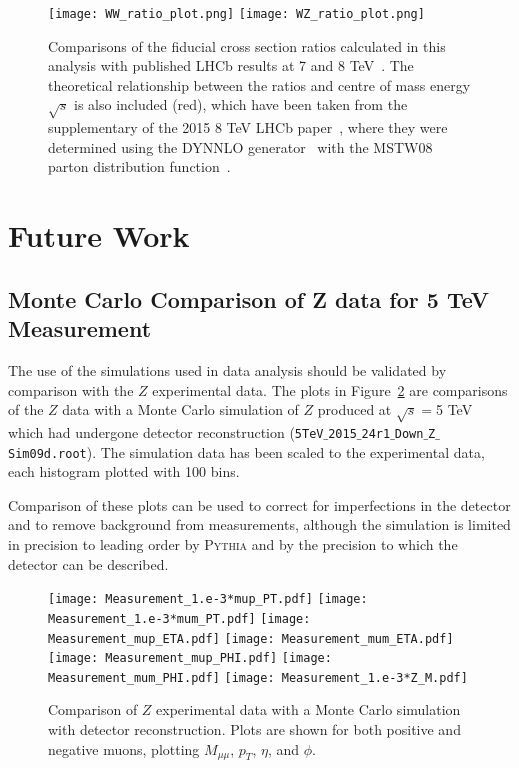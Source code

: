 \documentclass[a4paper]{article}
\begin{document}
\begin{figure}[t]
\centering
\texttt{[image: WW\_ratio\_plot.png]}
\texttt{[image: WZ\_ratio\_plot.png]} %
\vspace{-4mm}
\caption{\small Comparisons of the fiducial cross section ratios calculated in this analysis with published LHCb results at 7 and 8 TeV~\cite{7TeV_Z_2015,8TeV_W+Z_2015}. The theoretical relationship between the ratios and centre of mass energy $\sqrt{s}$ is also included (red), which have been taken from the supplementary of the 2015 8 TeV LHCb paper~\cite{8TeV_W+Z_2015}, where they were determined using the DYNNLO generator~\cite{DYNNLO} with the MSTW08 parton distribution function~\cite{MSTW08}.} 
\label{fig: ratio comparison}
\end{figure}


\section{Future Work} \label{sec: future work}
\subsection{Monte Carlo Comparison of Z data for 5 TeV Measurement} \label{Z histograms}
The use of the simulations used in data analysis should be validated by comparison with the $Z$ experimental data. 
The plots in Figure~\ref{fig: Z histograms} are comparisons of the $Z$ data with a Monte Carlo simulation of $Z$ produced at $\sqrt{s}=$5 TeV which had undergone detector reconstruction (\texttt{5TeV$\_$2015$\_$24r1$\_$Down$\_$Z$\_$Sim09d.root}). 
The simulation data has been scaled to the experimental data, each histogram plotted with 100 bins. 

Comparison of these plots can be used to correct for imperfections in the detector and to remove background from measurements, although the simulation is limited in precision to leading order by \textsc{Pythia} and by the precision to which the detector can be described.

\begin{figure}[bt]
\centering
\texttt{[image: Measurement\_1.e-3*mup\_PT.pdf]}
\texttt{[image: Measurement\_1.e-3*mum\_PT.pdf]}
\texttt{[image: Measurement\_mup\_ETA.pdf]}
\texttt{[image: Measurement\_mum\_ETA.pdf]}
\texttt{[image: Measurement\_mup\_PHI.pdf]}
\texttt{[image: Measurement\_mum\_PHI.pdf]}
\texttt{[image: Measurement\_1.e-3*Z\_M.pdf]}
\vspace{-4mm}
\caption{\small Comparison of $Z$ experimental data with a Monte Carlo simulation with detector reconstruction. Plots are shown for both positive and negative muons, plotting $M_{\mu\mu}$, $p_T$, $\eta$, and $\phi$.}
\label{fig: Z histograms}
\end{figure}




\end{document}
